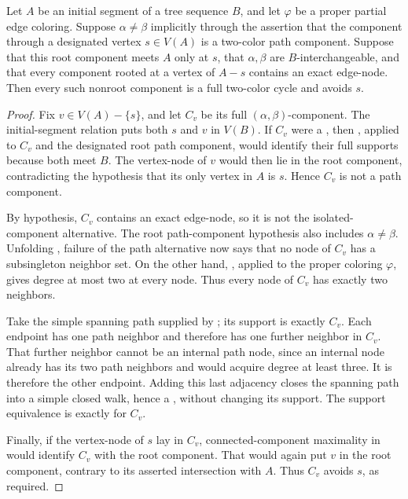 \begin{helper}
Let \(A\) be an initial segment of a tree sequence \(B\), and let
\(\varphi\) be a proper partial edge coloring.  Suppose \(\alpha\ne\beta\)
implicitly through the assertion that the component through a designated
vertex \(s\in V(A)\) is a two-color path component.  Suppose that this
root component meets \(A\) only at \(s\), that \(\alpha,\beta\) are
\(B\)-interchangeable, and that every component rooted at a vertex of
\(A-s\) contains an exact edge-node.  Then every such nonroot component
is a full two-color cycle and avoids \(s\).
\end{helper}
\begin{proof}
Fix \(v\in V(A)-\{s\}\), and let \(C_v\) be its full
\((\alpha,\beta)\)-component.  The initial-segment relation
 puts both \(s\) and \(v\) in
\(V(B)\).  If \(C_v\) were a , then
, applied to \(C_v\) and the designated
root path component, would identify their full supports because both
meet \(B\).  The vertex-node of \(v\) would then lie in the root
component, contradicting the hypothesis that its only vertex in \(A\)
is \(s\).  Hence \(C_v\) is not a path component.

By hypothesis, \(C_v\) contains an exact edge-node, so it is not the
isolated-component alternative.  The root path-component hypothesis
also includes \(\alpha\ne\beta\).  Unfolding
, failure of the path alternative now
says that no node of \(C_v\) has a subsingleton neighbor set.  On the
other hand, , applied to the
proper coloring \(\varphi\), gives degree at most two at every node.
Thus every node of \(C_v\) has exactly two neighbors.

Take the simple spanning path supplied by
; its support is exactly \(C_v\).
Each endpoint has one path neighbor and therefore has one further
neighbor in \(C_v\).  That further neighbor cannot be an internal path
node, since an internal node already has its two path neighbors and
would acquire degree at least three.  It is therefore the other endpoint.
Adding this last adjacency closes the spanning path into a simple closed
walk, hence a , without changing its support.
The support equivalence is exactly
 for \(C_v\).

Finally, if the vertex-node of \(s\) lay in \(C_v\), connected-component
maximality in  would identify \(C_v\) with
the root component.  That would again put \(v\) in the root component,
contrary to its asserted intersection with \(A\).  Thus \(C_v\) avoids
\(s\), as required.
\end{proof}
